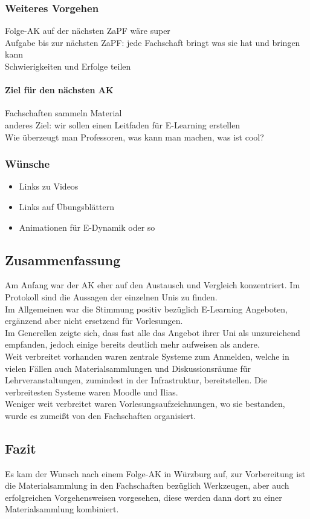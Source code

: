 	\subsubsection*{Weiteres Vorgehen}
		Folge-AK auf der nächsten ZaPF wäre super \\
		Aufgabe bis zur nächsten ZaPF: jede Fachschaft bringt was sie hat und bringen kann \\
		Schwierigkeiten und Erfolge teilen

		\paragraph{Ziel für den nächsten AK}
			Fachschaften sammeln Material \\
			anderes Ziel: wir sollen einen Leitfaden für E-Learning erstellen \\

			Wie überzeugt man Professoren, was kann man machen, was ist cool?

	\subsubsection*{Wünsche}
		\begin{itemize}
			\item Links zu Videos
			\item Links auf Übungsblättern
			\item Animationen für E-Dynamik oder so
		\end{itemize}

	\subsection*{Zusammenfassung}
		Am Anfang war der AK eher auf den Austausch und Vergleich konzentriert. Im Protokoll sind die
		Aussagen der einzelnen Unis zu finden. \\

		Im Allgemeinen war die Stimmung positiv bezüglich E-Learning Angeboten, ergänzend aber nicht ersetzend
		für Vorlesungen. \\

		Im Generellen zeigte sich, dass fast alle das Angebot ihrer Uni als unzureichend empfanden,
		jedoch einige bereits deutlich mehr aufweisen als andere. \\

		Weit verbreitet vorhanden waren zentrale Systeme zum Anmelden, welche in vielen Fällen auch
		Materialsammlungen und Diskussionsräume für Lehrveranstaltungen, zumindest in der Infrastruktur,
		bereitstellen. Die verbreitesten Systeme waren Moodle und Ilias. \\

		Weniger weit verbreitet waren Vorlesungsaufzeichnungen, wo sie bestanden, wurde es zumeißt von den Fachschaften organisiert.

	\subsection*{Fazit}
		Es kam der Wunsch nach einem Folge-AK in Würzburg auf, zur Vorbereitung ist die Materialsammlung in
		den Fachschaften bezüglich Werkzeugen, aber auch erfolgreichen Vorgehensweisen vorgesehen,
		diese werden dann dort zu einer Materialsammlung kombiniert.
